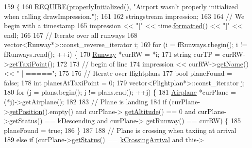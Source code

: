 \begin{DoxyCode}
159                                                                                   \{
160     \hyperlink{DesignByContract_8h_aeb774672b46dbe80afc14e0d1970f017}{REQUIRE}(\hyperlink{classAirport_a1ac3a730b557a36ac7521cce6ab64722}{properlyInitialized}(), \textcolor{stringliteral}{"Airport wasn't properly initialized when
       calling drawImpression."});
161 
162     stringstream impression;
163 
164     \textcolor{comment}{// We begin with a timestamp}
165     impression << \textcolor{stringliteral}{"["} << time.\hyperlink{classTime_aeeb2d2b5a624d0d78b7f5d146d0682f5}{formatted}() << \textcolor{stringliteral}{"]"} << endl;
166 
167     \textcolor{comment}{// Iterate over all runways}
168     vector<Runway*>::const\_reverse\_iterator i;
169     \textcolor{keywordflow}{for} (i = fRunways.rbegin(); i != fRunways.rend(); ++i) \{
170         \hyperlink{classRunway}{Runway} *curRW = *i;
171         \textcolor{keywordtype}{string} curTP = curRW->\hyperlink{classRunway_ad2d8fd5696ec93e2fa3d32bec3d02f59}{getTaxiPoint}();
172 
173         \textcolor{comment}{// begin of line}
174         impression << curRW->\hyperlink{classRunway_a2934c38f3af6080f7b40c306a27c57cd}{getName}() << \textcolor{stringliteral}{" | ====="};
175 
176         \textcolor{comment}{// Iterate over flightplans}
177         \textcolor{keywordtype}{bool} planeFound = \textcolor{keyword}{false};
178         \textcolor{keywordtype}{int} planesAtTaxiPoint = 0;
179         vector<Flightplan*>::const\_iterator j;
180         \textcolor{keywordflow}{for} (j = plans.begin(); j != plans.end(); ++j) \{
181             \hyperlink{classAirplane}{Airplane} *curPlane = (*j)->getAirplane();
182 
183             \textcolor{comment}{// Plane is landing}
184             \textcolor{keywordflow}{if} (curPlane->\hyperlink{classAirplane_ab4fa66c0adb05725a51524265f8c520c}{getPosition}().empty() and curPlane->
      \hyperlink{classAirplane_ad2550909ab563f7df850f79f23c3a308}{getAltitude}() == 0 and curPlane->\hyperlink{classAirplane_a40bbb3024a476115700977c60bae2705}{getStatus}() == \hyperlink{Airplane_8h_a0e5bbf7c6c727baaba49062300fae19fa65b72f8e33cb194d21d822e5b6626e2e}{kDescending} and curPlane->
      \hyperlink{classAirplane_ab6dda72f7cfd29a7334e0494d184bbfa}{getRunway}() == curRW) \{
185                 planeFound = \textcolor{keyword}{true};
186             \}
187 
188             \textcolor{comment}{// Plane is crossing when taxiing at arrival}
189             \textcolor{keywordflow}{else} \textcolor{keywordflow}{if} (curPlane->\hyperlink{classAirplane_a40bbb3024a476115700977c60bae2705}{getStatus}() == \hyperlink{Airplane_8h_a0e5bbf7c6c727baaba49062300fae19fac8a18187b65420ae9ceda0d5073512ce}{kCrossingArrival} and this->

\end{DoxyCode}
